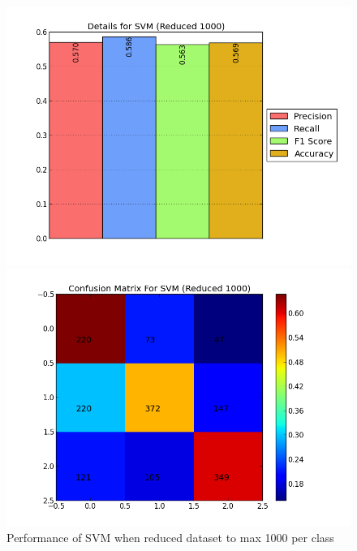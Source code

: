 \begin{figure}[htb]
	\centering
	\begin{minipage}{.45\linewidth}
		\includegraphics[width=\linewidth]{../img/plots/analysis/svm_stats_best_reduced_1000.png}
	\end{minipage}
	\hspace{0.05\linewidth}
	\begin{minipage}{.45\linewidth}
		\includegraphics[width=\linewidth]{../img/plots/analysis/svm_confusion_matrix_best_reduced_1000.png}
	\end{minipage}
	\caption[Performance of SVM when reduced dataset to max 1000 per class]{Performance of SVM when reduced dataset to max 1000 per class}
	\label{fig:svm_reduced_1000}
\end{figure}

